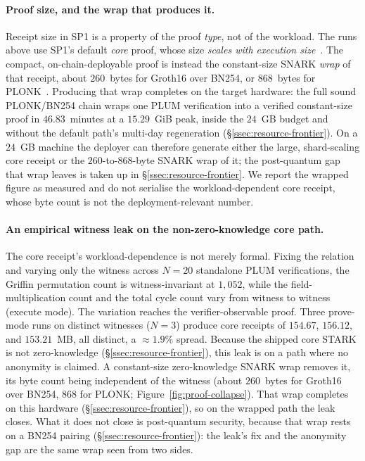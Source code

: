 \paragraph{Proof size, and the wrap that produces it.}
Receipt size in SP1 is a property of the proof \emph{type}, not of the workload. The runs above use SP1's default \emph{core} proof, whose size \emph{scales with execution size}~\cite{succinct2025prooftypes}. The compact, on-chain-deployable proof is instead the constant-size {SNARK} \emph{wrap} of that receipt, about $260$~bytes for Groth16 over {BN254}, or $868$~bytes for {PLONK}~\cite{succinct2025prooftypes}. Producing that wrap completes on the target hardware: the full sound {PLONK}/{BN254} chain wraps one PLUM verification into a verified constant-size proof in $46.83$~minutes at a $15.29$~GiB peak, inside the $24$~GB budget and without the default path's multi-day regeneration (\S\ref{ssec:resource-frontier}). On a $24$~GB machine the deployer can therefore generate either the large, shard-scaling core receipt or the $260$-to-$868$-byte {SNARK} wrap of it; the post-quantum gap that wrap leaves is taken up in \S\ref{ssec:resource-frontier}. We report the wrapped figure as measured and do not serialise the workload-dependent core receipt, whose byte count is not the deployment-relevant number.

\paragraph{An empirical witness leak on the non-zero-knowledge core path.}
The core receipt's workload-dependence is not merely formal. Fixing the relation and varying only the witness across $N=20$ standalone PLUM verifications, the Griffin permutation count is witness-invariant at $1{,}052$, while the field-multiplication count and the total cycle count vary from witness to witness (execute mode). The variation reaches the verifier-observable proof. Three prove-mode runs on distinct witnesses ($N=3$) produce core receipts of $154.67$, $156.12$, and $153.21$~MB, all distinct, a ${\approx}1.9\%$ spread. Because the shipped core STARK is not zero-knowledge (\S\ref{ssec:resource-frontier}), this leak is on a path where no anonymity is claimed. A constant-size zero-knowledge SNARK wrap removes it, its byte count being independent of the witness (about $260$~bytes for Groth16 over BN254, $868$ for PLONK; Figure~\ref{fig:proof-collapse}). That wrap completes on this hardware (\S\ref{ssec:resource-frontier}), so on the wrapped path the leak closes. What it does not close is post-quantum security, because that wrap rests on a {BN254} pairing (\S\ref{ssec:resource-frontier}): the leak's fix and the anonymity gap are the same wrap seen from two sides.

